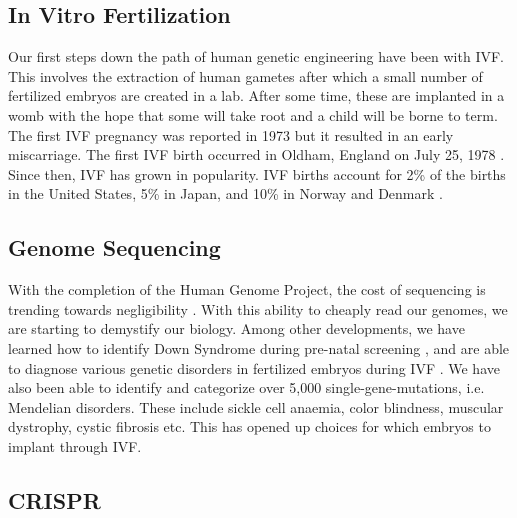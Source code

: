 \subsection{In Vitro Fertilization}

Our first steps down the path of human genetic engineering have been with IVF.
This involves the extraction of human gametes after which a small number of fertilized embryos are created in a lab.
After some time, these are implanted in a womb with the hope that some will take root and a child will be borne to term.
The first IVF pregnancy was reported in 1973 \cite{Kretzer1973} but it resulted in an early miscarriage.
The first IVF birth occurred in Oldham, England on July 25, 1978 \cite{Steptoe1978}.
Since then, IVF has grown in popularity.
IVF births account for 2\% of the births in the United States, 5\% in Japan, and 10\% in Norway and Denmark \cite{Metzl2019}.

\subsection{Genome Sequencing}

With the completion of the Human Genome Project, the cost of sequencing is trending towards negligibility \cite{Wetterstrand2019}.
With this ability to cheaply read our genomes, we are starting to demystify our biology.
Among other developments, we have learned how to identify Down Syndrome during pre-natal screening \cite{Natoli2012}, and are able to diagnose various genetic disorders in fertilized embryos during IVF \cite{Rycke2017}.
We have also been able to identify and categorize over 5,000 single-gene-mutations, i.e. Mendelian disorders.
These include sickle cell anaemia, color blindness, muscular dystrophy, cystic fibrosis etc.
This has opened up choices for which embryos to implant through IVF.

\subsection{CRISPR}

